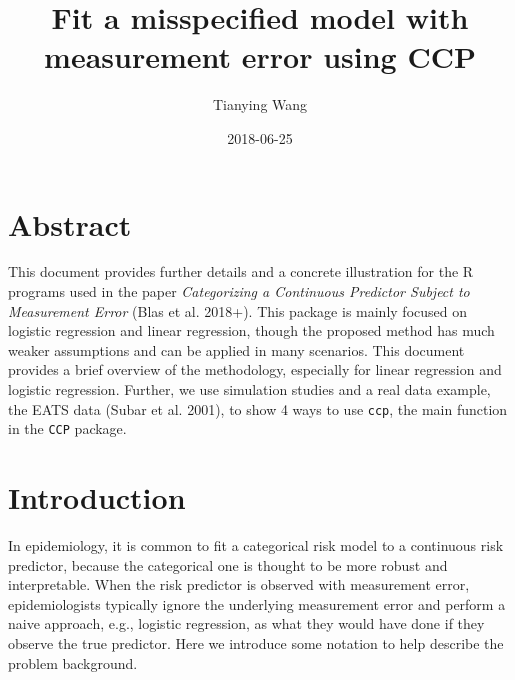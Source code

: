 \documentclass[15 pt,]{article}
\title{Fit a misspecified model with measurement error using CCP}
\author{Tianying Wang}
\date{2018-06-25}
\begin{document}
\maketitle

\newcommand{\bomega}{\mbox{\boldmath $\omega$}}
\newcommand{\bbeta}{\mbox{\boldmath $\beta$}}
\newcommand{\bTheta}{\mbox{\boldmath $\Theta$}}
\newcommand{\bOmega}{\mbox{\boldmath $\Omega$}}
\newcommand{\bLambda}{\mbox{\boldmath $\Lambda$}}

\def\extLambda{\bLambda_{\rm ext}} \def\intLambda{\bLambda_{\rm int}}
\def\sumi{\hbox{$\sum_{i=1}^{n}$}} \def\sumj{\hbox{$\sum_{j=1}^J$}}
\def\suml{\hbox{$\sum_{\ell=1}^L$}}
\def\sumk{\hbox{$\sum_{k=1}^{K_{\ell}}$}}
\def\sumkl{\hbox{$\sum_{k,\ell}$}} \def\sumb{\hbox{$\sum_{b=1}^{B}$}}
\def\exPhi{\Phi_{\rm true}} \def\catPhi{\Phi_{\rm cat}}
\def\wh{\widehat} \def\trans{^{\rm T}} \def\pr{\hbox{pr}}

\section{Abstract}\label{abstract}

This document provides further details and a concrete illustration for
the R programs used in the paper \emph{Categorizing a Continuous
Predictor Subject to Measurement Error} (Blas et al. 2018+). This
package is mainly focused on logistic regression and linear regression,
though the proposed method has much weaker assumptions and can be
applied in many scenarios. This document provides a brief overview of
the methodology, especially for linear regression and logistic
regression. Further, we use simulation studies and a real data example,
the EATS data (Subar et al. 2001), to show 4 ways to use \texttt{ccp},
the main function in the \texttt{CCP} package.

\section{Introduction}\label{introduction}

In epidemiology, it is common to fit a categorical risk model to a
continuous risk predictor, because the categorical one is thought to be
more robust and interpretable. When the risk predictor is observed with
measurement error, epidemiologists typically ignore the underlying
measurement error and perform a naive approach, e.g., logistic
regression, as what they would have done if they observe the true
predictor. Here we introduce some notation to help describe the problem
background.
\end{document}
